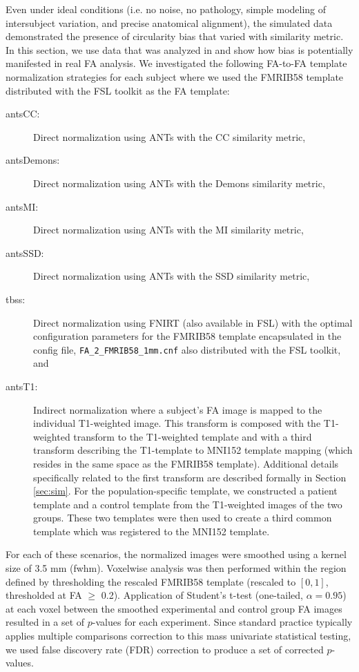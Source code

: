 \documentclass[final,5p,times,twocolumn]{elsarticle}
\begin{document}
Even under ideal conditions (i.e. no noise, no pathology, simple modeling of 
intersubject variation, and precise anatomical alignment), the simulated
data demonstrated the presence of circularity bias that varied with similarity
metric.  In this section, we use data that was analyzed in \cite{Stone2011}
and show how bias is potentially manifested in real FA analysis.  We investigated
the following FA-to-FA template normalization strategies for each subject where we used the  FMRIB58 template distributed with the FSL toolkit as the FA template:
\begin{description}
  \item[antsCC:] Direct normalization using ANTs with the CC similarity metric,
  \item[antsDemons:] Direct normalization using ANTs with the Demons similarity metric,
  \item[antsMI:] Direct normalization using ANTs with the MI similarity metric,
  \item[antsSSD:] Direct normalization using ANTs with the SSD similarity metric,
  \item[tbss:] Direct normalization using FNIRT (also available in FSL) with the
        optimal configuration parameters for the FMRIB58 template encapsulated
        in the config file, \verb#FA_2_FMRIB58_1mm.cnf# also distributed
        with the FSL toolkit, and
  \item[antsT1:] Indirect normalization where a subject's FA image is mapped to the individual
        T1-weighted image.  This transform is composed with the T1-weighted
        transform to the T1-weighted template and with a third transform describing the
        T1-template to MNI152 template mapping (which resides in the same space as the FMRIB58
        template). Additional details specifically related to the first transform
        are described formally in
        Section \ref{sec:sim}.  For the population-specific template, we constructed a patient                  
        template and a control template from the T1-weighted images of the two groups.  
        These two templates were then used to create a third common template which was 
        registered to the MNI152 template.  
\end{description}

For each of these scenarios, the normalized images were smoothed using
a kernel size of 3.5 mm (fwhm).  
Voxelwise analysis was then performed
within the region defined by thresholding the rescaled FMRIB58 template
(rescaled to $[0,1]$, thresholded at FA $\geq$ 0.2). Application of
 Student's t-test 
(one-tailed, $\alpha = 0.95$)
 at each voxel between the smoothed experimental and control group
 FA images
resulted in a set of $p$-values for each experiment.  Since standard
practice typically applies multiple comparisons correction to this
mass univariate statistical testing, we used
false discovery rate (FDR) correction to produce a set of corrected
$p$-values.  
\end{document}
